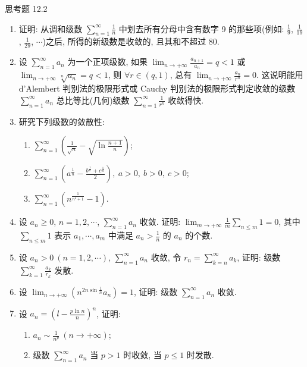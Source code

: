 \begin{exblock}{思考题 12.2}
\begin{enumerate}
\begin{enumerate}
    \item[(1)] 证明: $\sum_{n=1}^{\infty}\frac{a_{n}}{1+a_{n}}$ 发散, $\sum_{n=1}^{\infty}\frac{a_{n}}{1+n^{2}a_{n}}$ 收敛.
    \item[(2)] 研究 $\sum_{n=1}^{\infty}\frac{a_{n}}{1+a_{n}^{2}}$, $\sum_{n=1}^{\infty}\frac{a_{n}}{1+na_{n}}$ 的敛散性.
  \end{enumerate}
  \item 证明: 从调和级数 $\sum_{n=1}^{\infty}\frac{1}{n}$ 中划去所有分母中含有数字 9 的那些项(例如: $\frac{1}{9}$, $\frac{1}{19}$, $\frac{1}{29}$, $\cdots$)之后, 所得的新级数是收敛的, 且其和不超过 80.
  \item 设 $\sum_{n=1}^{\infty}a_{n}$ 为一个正项级数, 如果 $\lim_{n\to+\infty}\frac{a_{n+1}}{a_{n}}=q<1$ 或 $\lim_{n\to+\infty}\sqrt[n]{a_{n}}=q<1$, 则 $\forall r\in(q,1)$, 总有 $\lim_{n\to+\infty}\frac{a_{n}}{r^{n}}=0$. 这说明能用 d'Alembert 判别法的极限形式或 Cauchy 判别法的极限形式判定收敛的级数 $\sum_{n=1}^{\infty}a_{n}$ 总比等比(几何)级数 $\sum_{n=1}^{\infty}\frac{1}{r^{n}}$ 收敛得快.
  \item 研究下列级数的敛散性:
  \begin{enumerate}
    \item $\displaystyle\sum_{n=1}^{\infty}\left(\frac{1}{\sqrt{n}}-\sqrt{\ln\frac{n+1}{n}}\right)$;
    \item $\displaystyle\sum_{n=1}^{\infty}\left(a^{\frac{1}{n}}-\frac{b^{\frac{1}{n}}+c^{\frac{1}{n}}}{2}\right),\ a>0,\ b>0,\ c>0$;
    \item $\displaystyle\sum_{n=1}^{\infty}\left(n^{\frac{1}{n^{2}+1}}-1\right)$.
  \end{enumerate}
  \item 设 $a_{n}\geqslant0$, $n=1,2,\cdots$, $\sum_{n=1}^{\infty}a_{n}$ 收敛. 证明: $\lim_{m\to+\infty}\frac{1}{m}\sum_{n\leqslant m}1=0$, 其中 $\sum_{n\leqslant m}1$ 表示 $a_{1},\cdots,a_{m}$ 中满足 $a_{n}>\frac{1}{n}$ 的 $a_{n}$ 的个数.
  \item 设 $a_{n}>0\ (n=1,2,\cdots)$, $\sum_{n=1}^{\infty}a_{n}$ 收敛, 令 $r_{n}=\sum_{k=n}^{\infty}a_{k}$, 证明: 级数 $\sum_{k=1}^{\infty}\frac{a_{k}}{r_{k}}$ 发散.
  \item 设 $\lim_{n\to+\infty}\left(n^{2n\sin\frac{1}{n}}a_{n}\right)=1$, 证明: 级数 $\sum_{n=1}^{\infty}a_{n}$ 收敛.
  \item 设 $a_{n}=\left(l-\frac{p\ln n}{n}\right)^{n}$, 证明:
  \begin{enumerate}
    \item[(1)] $a_{n}\sim\frac{1}{n^{p}}\ (n\to+\infty)$;
    \item[(2)] 级数 $\sum_{n=1}^{\infty}a_{n}$ 当 $p>1$ 时收敛, 当 $p\leqslant1$ 时发散.

\end{enumerate}
\end{enumerate}
\end{exblock}
